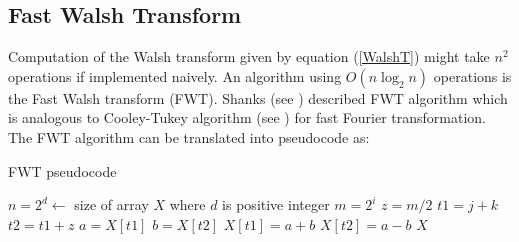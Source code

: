 \subsection{Fast Walsh Transform}
Computation of the Walsh transform given by equation (\ref{WalshT}) might take $n^2$ operations 
if implemented naively.
An algorithm using $O(n \log_2 n)$ operations is the Fast Walsh transform (FWT). 
Shanks (see \cite{Shanks1969}) described FWT algorithm which is analogous to 
Cooley-Tukey algorithm (see \cite{CooleyTukey1965}) for fast Fourier transformation.
The FWT algorithm can be translated into pseudocode as:
\begin{algorithm}[ht]
\caption{FWT pseudocode}
\label{FWTpseudo}
\begin{algorithmic}[1]

\State $n = 2^d   \gets $  size of array $X$ where $d$ is positive integer
\State $m = 2^i$
\State $z = m/2$
\State $t1 = j + k$
\State $t2 = t1 + z$
\State $a = X[t1]$
\State $b= X[t2]$
\State $X[t1] = a + b$
\State $X[t2] = a - b$
\EndFor
\EndFor
\EndFor
\State \Return $X$
\EndProcedure
\end{algorithmic}
\end{algorithm}

